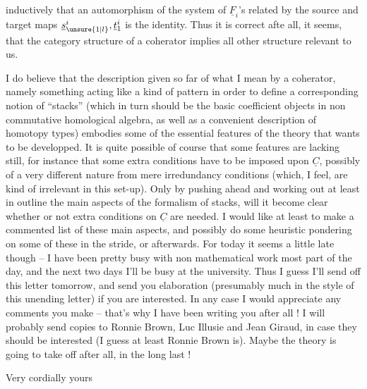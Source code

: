 
 inductively that an automorphism of the system of $\underline{F}_i$'s related by the source and target maps $\underline{s}_{\unsure{1|l}}^i,\underline{t}_1^i$ is the identity. Thus it is correct afte all, it seems, that the category structure of a coherator implies all other structure relevant to us.

I do believe that the description given so far of what I mean by a coherator,  namely something acting like a kind of pattern in order to define a corresponding notion of ``stacks'' (which in turn should be the basic coefficient objects in non commutative homological algebra, as well as a convenient description of homotopy types) embodies some of the essential features of the theory that wants to be developped. It is quite possible of course that some features are lacking still, for instance that some extra conditions have to be imposed upon $\underline{C}$, possibly of a very different nature from mere irredundancy conditions (which, I feel, are kind of irrelevant in this set-up). Only by pushing ahead and working out at least in outline the main aspects of the formalism of stacks, will it become clear whether or not extra conditions on $\underline{C}$ are needed. I would like at least to make a commented list of these main aspects, and possibly do some heuristic pondering on some of these in the stride, or afterwards. For today it seems a little late though -- I have been pretty busy with non mathematical work most part of the day, and the next two days I'll be busy at the university. Thus I guess I'll send off this letter tomorrow, and send you  elaboration (presumably much in the style of this unending letter) if you are interested. In any case I would appreciate any comments you make -- that's why I have been writing you after all ! I will probably send copies to Ronnie Brown, Luc Illusie and Jean Giraud, in case they should be interested (I guess at least Ronnie Brown is). Maybe the theory is going to take off after all, in the long last !

Very cordially yours\\
\hfill{}\\

